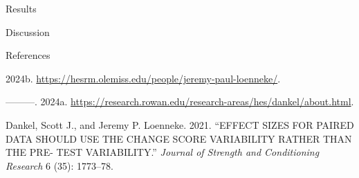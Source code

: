 \documentclass[
  ignorenonframetext,
  aspectratio=169,
]{beamer}
\newlength{\cslhangindent}
\newlength{\cslentryspacingunit} %
\newenvironment{CSLReferences}[2] %
 {%
  \setlength{\parindent}{0pt}
  \ifodd #1
  \let\oldpar\par
  \def\par{\hangindent=\cslhangindent\oldpar}
  \fi
  \setlength{\parskip}{#2\cslentryspacingunit}
 }%
 {}
\begin{document}
\begin{frame}{Results}
\protect\hypertarget{results}{}
\end{frame}

\begin{frame}{Discussion}
\protect\hypertarget{discussion}{}
\end{frame}

\begin{frame}{References}
\protect\hypertarget{references}{}
\hypertarget{refs}{}
\begin{CSLReferences}{1}{0}
\leavevmode{}%
2024b. \url{https://hesrm.olemiss.edu/people/jeremy-paul-loenneke/}.

\leavevmode{}%
---------. 2024a.
\url{https://research.rowan.edu/research-areas/hes/dankel/about.html}.

\leavevmode{}%
Dankel, Scott J., and Jeremy P. Loenneke. 2021. {``EFFECT SIZES FOR
PAIRED DATA SHOULD USE THE CHANGE SCORE VARIABILITY RATHER THAN THE PRE-
TEST VARIABILITY.''} \emph{Journal of Strength and Conditioning
Research} 6 (35): 1773--78.

\end{CSLReferences}
\end{frame}
\end{document}
